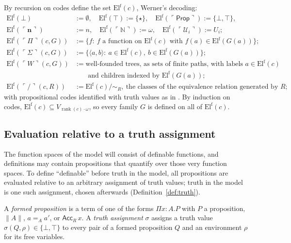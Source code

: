 \documentclass[10pt]{article}
\newcommand{\N}{\mathbb{N}}
\newcommand{\Prop}{\mathsf{Prop}}
\newcommand{\rk}{\operatorname{rank}}
\newcommand{\El}{\mathrm{El}}
\newcommand{\code}[1]{\ulcorner #1\urcorner}
\newcommand{\U}{\mathcal{U}}
\begin{document}
\begin{definition}\label{def:Elf}
By recursion on codes define the set $\El^{\mathrm f}(c)$, Werner's decoding:
\begin{align*}
\El^{\mathrm f}(\bot)&:=\emptyset,\quad \El^{\mathrm f}(\top):=\{\star\},\quad
\El^{\mathrm f}(\code\Prop):=\{\bot,\top\},\\
\El^{\mathrm f}(\code{\mathbf n})&:=n,\quad
\El^{\mathrm f}(\code\N):=\omega,\quad \El^{\mathrm f}(\code{\U_i}):=U_i;\\
\El^{\mathrm f}(\code\Pi(c,G))&:=\{f:\ f\text{ a function on }\El^{\mathrm f}(c)\text{ with }f(a)\in\El^{\mathrm f}(G(a))\};\\
\El^{\mathrm f}(\code\Sigma(c,G))&:=\{\langle a,b\rangle:\ a\in\El^{\mathrm f}(c),\ b\in\El^{\mathrm f}(G(a))\};\\
\El^{\mathrm f}(\code W(c,G))&:=\text{well-founded trees, as sets of finite paths, with labels }a\in\El^{\mathrm f}(c)\\
&\phantom{:=}\text{ and children indexed by }\El^{\mathrm f}(G(a));\\
\El^{\mathrm f}(\code/(c,R))&:=\El^{\mathrm f}(c)/{\sim_R},\ \text{the classes of the equivalence relation generated by }R;
\end{align*}
with propositional codes identified with truth values as in
\cite[Def.~4.1]{paper1}. By induction on codes,
$\El^{\mathrm f}(c)\subseteq V_{\rk(c)\cdot\omega}$, so every family $G$ is
defined on all of $\El^{\mathrm f}(c)$.
\end{definition}

\subsection{Evaluation relative to a truth assignment}\label{sec:hybrid}

The function spaces of the model will consist of definable functions,
and definitions may contain propositions that quantify over those very
function spaces. To define ``definable'' before truth in the model, all
propositions are evaluated relative to an arbitrary assignment of truth
values; truth in the model is one such assignment, chosen afterwards
(Definition~\ref{def:truth}).

\begin{definition}\label{def:sigma}
A \emph{formed proposition} is a term of one of the forms
$\Pi x{:}A.P$ with $P$ a proposition, $\|A\|$, $a=_Aa'$, or
$\mathsf{Acc}_R\,x$. A \emph{truth assignment} $\sigma$ assigns a truth
value $\sigma(Q,\rho)\in\{\bot,\top\}$ to every pair of a formed
proposition $Q$ and an environment $\rho$ for its free variables.
\end{definition}
\end{document}
